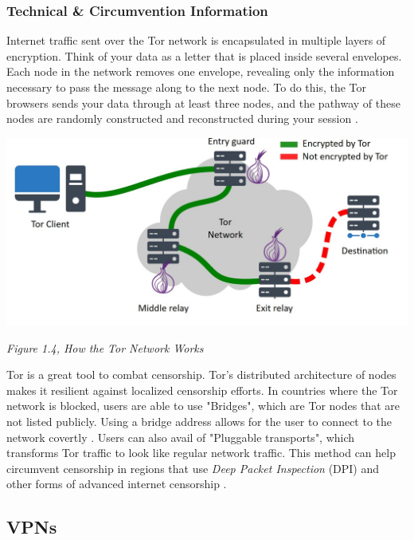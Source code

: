 \subsubsection{Technical \& Circumvention Information}

Internet traffic sent over the Tor network is encapsulated in multiple layers of encryption. Think of your data as a letter that is placed inside several envelopes. Each node in the network removes one envelope, revealing only the information necessary to pass the message along to the next node. To do this, the Tor browsers sends your data through at least three nodes, and the pathway of these nodes are randomly constructed and reconstructed during your session \cite{dingledine2004tor}.

\centerline{\includegraphics[width=480pt]{Griff/Latex/TCD SCSS CAPSTONE/Literature Review/How tor works.jpg}}

\centerline{\textit{Figure 1.4, How the Tor Network Works}}

Tor is a great tool to combat censorship. Tor's distributed architecture of nodes makes it resilient against localized censorship efforts. In countries where the Tor network is blocked, users are able to use "Bridges", which are Tor nodes that are not listed publicly. Using a bridge address allows for the user to connect to the network covertly \cite{torprojectBRIDGESProject}. Users can also avail of "Pluggable transports", which transforms Tor traffic to look like regular network traffic. This method can help circumvent censorship in regions that use \textit{Deep Packet Inspection} (DPI) and other forms of advanced internet censorship \cite{torprojectCIRCUMVENTIONProject}.

\subsection{VPNs}

